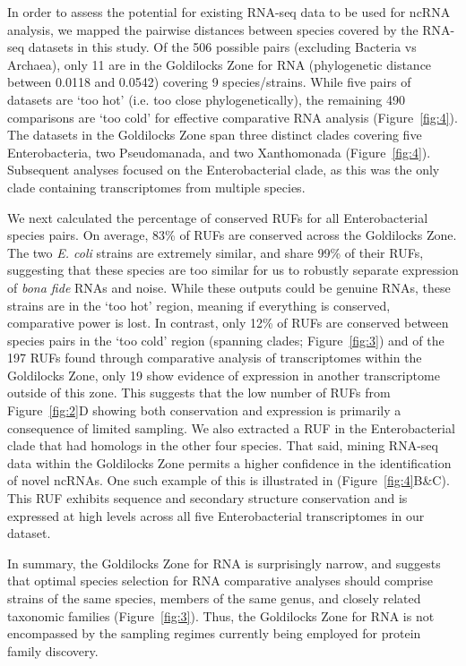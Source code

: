 \documentclass[10pt]{article}
\begin{document}
In order to assess the potential for existing RNA-seq data to be used
for ncRNA analysis, we mapped the pairwise distances between species
covered by the RNA-seq datasets in this study. Of the 506 possible
pairs (excluding Bacteria vs Archaea), only 11 are in the Goldilocks
Zone for RNA (phylogenetic distance between 0.0118 and 0.0542)
covering 9 species/strains. While five pairs of datasets are ‘too hot’
(i.e. too close phylogenetically), the remaining 490 comparisons are
‘too cold’ for effective comparative RNA analysis
(Figure~\ref{fig:4}). The datasets in the Goldilocks Zone span three
distinct clades covering five Enterobacteria, two Pseudomanada, and
two Xanthomonada (Figure~\ref{fig:4}). Subsequent analyses focused on
the Enterobacterial clade, as this was the only clade containing
transcriptomes from multiple species.

We next calculated the percentage of conserved RUFs for all
Enterobacterial species pairs. On average, 83\% of RUFs are conserved
across the Goldilocks Zone. The two \emph{E. coli} strains are extremely
similar, and share 99\% of their RUFs, suggesting that these species
are too similar for us to robustly separate expression of \emph{bona fide}
RNAs and noise. While these outputs could be genuine RNAs, these
strains are in the ‘too hot’ region, meaning if everything is
conserved, comparative power is lost. In contrast, only 12\% of RUFs
are conserved between species pairs in the ‘too cold’ region (spanning
clades; Figure~\ref{fig:3}) and of the 197 RUFs found through
comparative analysis of transcriptomes within the Goldilocks Zone,
only 19 show evidence of expression in another transcriptome outside
of this zone. This suggests that the low number of RUFs from
Figure~\ref{fig:2}D showing both conservation and expression is
primarily a consequence of limited sampling.  We also extracted a RUF
in the Enterobacterial clade that had homologs in the other four
species.  That said, mining RNA-seq data within the Goldilocks Zone
permits a higher confidence in the identification of novel ncRNAs. One
such example of this is illustrated in (Figure~\ref{fig:4}B\&C). This
RUF exhibits sequence and secondary structure conservation and is
expressed at high levels across all five Enterobacterial
transcriptomes in our dataset.

In summary, the Goldilocks Zone for RNA is surprisingly narrow, and
suggests that optimal species selection for RNA comparative analyses
should comprise strains of the same species, members of the same
genus, and closely related taxonomic families (Figure~\ref{fig:3}). Thus, the
Goldilocks Zone for RNA is not encompassed by the sampling regimes
currently being employed for protein family discovery.
\end{document}
